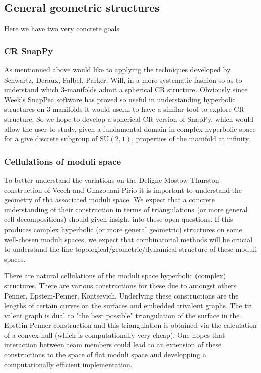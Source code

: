 \documentclass[14pt,fleqn]{article}
\begin{document}
\subsection{General geometric structures}

Here we have two very concrete goals

\subsubsection{CR SnapPy}
As mentionned above would like to applying the  techniques developed 
by Schwartz, Deraux, Falbel, Parker, Will, in a
more systematic fashion so as to understand
which 3-manifolds admit a spherical CR structure.
Obviously since Week's SnapPea software 
has proved so useful in understanding 
hyperbolic structures on 3-manifolds
it would useful to have a similar tool
to explore CR structure.
So we hope to develop a spherical CR version of SnapPy,
which would allow the user to study, 
given a fundamental domain 
in complex hyperbolic space  for a
give discrete subgroup of $\mathrm{SU}(2,1)$, properties of the  manifold at infinity.


\subsubsection{Cellulations of moduli space}

To better understand the variations 
on the Deligne-Mostow-Thurston construction
of  Veech and Ghazouani-Pirio
it is important to understand the geometry
of tha associated moduli space.
We expect that a concrete understanding of their construction in terms of triangulations (or more general cell-decompositions) should given
insight into these open questions. 
If this produces complex hyperbolic
(or more general geometric) structures on some well-chosen moduli spaces, we expect that combinatorial methods will be crucial to understand the fine topological/geometric/dynamical structure of these
moduli spaces.

There are  natural cellulations of 
the moduli space hyperbolic (complex)  structures.
There are various constructions for these
due to amongst others Penner, Epstein-Penner,  Kontsevich.
Underlying these constructions 
are the lengths of certain curves on the surfaces
and embedded trivalent graphs.
The tri valent graph is dual to 
"the best possible" triangulation of the surface
in the Epstein-Penner construction
and this triangulation is obtained 
via the calculation of a convex hull
(which is computationally very cheap).
One hopes that interaction between team members
could lead to an extension of these constructions
to the space of flat moduli space 
and developping a computationally efficient
implementation.
 
\end{document}
